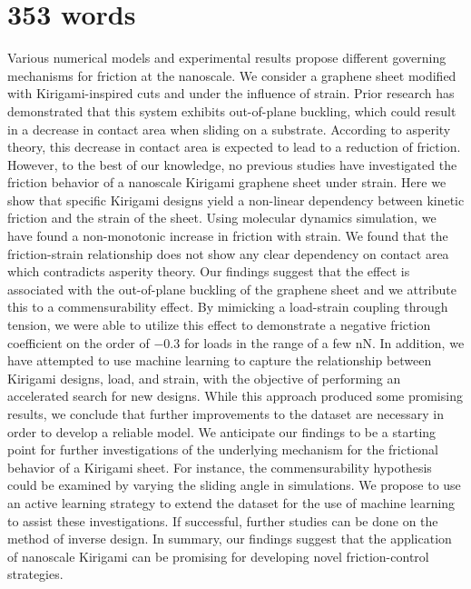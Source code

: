 \section*{353 words}
Various numerical models and experimental results propose different governing
mechanisms for friction at the nanoscale. We consider a graphene sheet modified
with Kirigami-inspired cuts and under the influence of strain. Prior research
has demonstrated that this system exhibits out-of-plane buckling, which could
result in a decrease in contact area when sliding on a substrate. According to
asperity theory, this decrease in contact area is expected to lead to a
reduction of friction. However, to the best of our knowledge, no previous
studies have investigated the friction behavior of a nanoscale Kirigami graphene
sheet under strain. Here we show that specific Kirigami designs yield a
non-linear dependency between kinetic friction and the strain of the sheet.
Using molecular dynamics simulation, we have found a non-monotonic increase in
friction with strain. We found that the friction-strain relationship does not
show any clear dependency on contact area which contradicts asperity theory. Our
findings suggest that the effect is associated with the out-of-plane buckling of
the graphene sheet and we attribute this to a commensurability effect. By
mimicking a load-strain coupling through tension, we were able to utilize this
effect to demonstrate a negative friction coefficient on the order of $-0.3$ for
loads in the range of a few nN. In addition, we have attempted to use machine
learning to capture the relationship between Kirigami designs, load, and strain,
with the objective of performing an accelerated search for new designs. While
this approach produced some promising results, we conclude that further
improvements to the dataset are necessary in order to develop a reliable model.
We anticipate our findings to be a starting point for further investigations of
the underlying mechanism for the frictional behavior of a Kirigami sheet. For
instance, the commensurability hypothesis could be examined by varying the
sliding angle in simulations. We propose to use an active learning strategy to
extend the dataset for the use of machine learning to assist these
investigations. If successful, further studies can be done on the method of
inverse design. In summary, our findings suggest that the application of
nanoscale Kirigami can be promising for developing novel friction-control
strategies.
